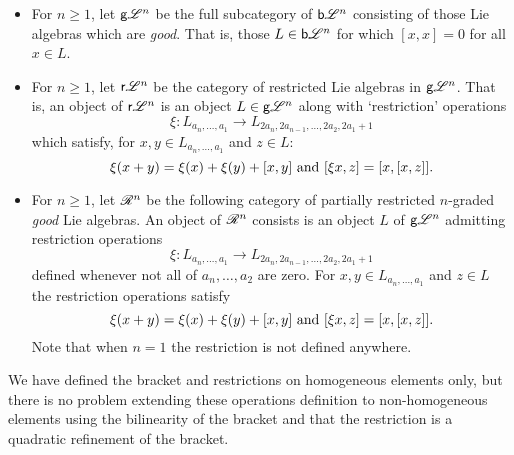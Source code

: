 \documentclass[11pt]{article}
\newcommand{\RestLie}[1]{\mathsf{r}{\scrL}^{#1}}%
\newcommand{\GoodLie}[1]{\mathsf{g}{\scrL}^{#1}}%
\newcommand{\BadLie}[1]{\mathsf{b}{\scrL}^{#1}}%
\newcommand{\PRLie}[1]{\scrR^{#1}}%
\newcommand{\GS}[1]{\scrG\!\scrS^{#1}}
\newcommand{\restn}[1]{\xi{#1}}
\newcommand{\Fr}[1]{#1}%
\begin{document}
\begin{CategoriesOfInterest}
\begin{itemize}
\item For $n\geq1$, let $\GoodLie{n}$ be the full subcategory of $\BadLie{n}$ consisting of those Lie algebras which are \emph{good}. That is, those $L\in\BadLie{n}$ for which $[x,x]=0$ for all $x\in L$.
\item For $n\geq1$, let $\RestLie{n}$ be the category of restricted Lie algebras in $\GoodLie{n}$. That is, an object of $\RestLie{n}$ is an object $L\in\GoodLie{n}$ along with `restriction' operations
\[\restn{}:L_{a_n,\ldots,a_1}\to L_{2a_n,2a_{n-1},\ldots,2a_2,2a_1+1}\]
which satisfy, for $x,y\in L_{a_n,\ldots,a_1}$ and $z\in L$: \[\restn{(x+y)}=\restn{(x)}+\restn{(y)}+[x,y]\textup{ and }[\restn{x},z]=[x,[x,z]].\]
\item For $n\geq1$, let $\PRLie{n}$ be the following category of partially restricted $n$-graded \emph{good} Lie algebras. An object of $\PRLie{n}$ consists is an object $L$ of $\GoodLie{n}$
admitting restriction operations
\[\restn{}:L_{a_n,\ldots,a_1}\to L_{2a_n,2a_{n-1},\ldots,2a_2,2a_1+1}\]
defined whenever not all of $a_n,\ldots,a_{2}$ are zero. %
For $x,y\in L_{a_n,\ldots,a_1}$ and $z\in L$ the restriction operations satisfy \[\restn{(x+y)}=\restn{(x)}+\restn{(y)}+[x,y]\textup{ and }[\restn{x},z]=[x,[x,z]].\]
Note that when $n=1$ the restriction is not defined anywhere.
\end{itemize}
We have defined the bracket and restrictions on homogeneous elements only, but there is no problem extending these operations definition to non-homogeneous elements using the bilinearity of the bracket and that the restriction is a quadratic refinement of the bracket.



\end{CategoriesOfInterest}
\end{document}

